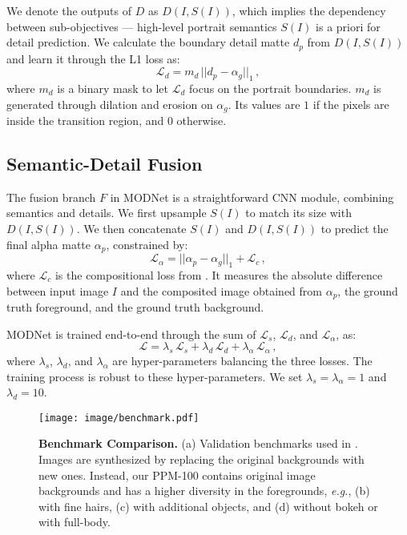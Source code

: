 \documentclass[letterpaper]{article} \usepackage{aaai22}  \usepackage{times}  \usepackage{helvet}  \usepackage{courier}  \usepackage[hyphens]{url}  \usepackage{graphicx} \urlstyle{rm} \def\UrlFont{\rm}  \usepackage{natbib}  \usepackage{caption} \usepackage{booktabs}
\begin{document}
We denote the outputs of $D$ as $D(I, S(I))$, which implies the dependency between sub-objectives --- high-level portrait semantics $S(I)$ is a priori for detail prediction. We calculate the boundary detail matte $d_p$ from $D(I, S(I))$ and learn it through the L1 loss as: 
\begin{equation}
    \mathcal{L}_{d} =  m_d \, \big|\big| d_p - \alpha_g \big|\big|_{1} \, ,
\end{equation}
where $m_d$ is a binary mask to let $\mathcal{L}_d$ focus on the portrait boundaries. $m_d$ is generated through dilation and erosion on $\alpha_{g}$. Its values are $1$ if the pixels are inside the transition region, and $0$ otherwise. 



\subsection{Semantic-Detail Fusion}\label{sec:3_4}
The fusion branch $F$ in MODNet is a straightforward CNN module, combining semantics and details.
We first upsample $S(I)$ to match its size with $D(I, S(I))$. We then concatenate $S(I)$ and $D(I, S(I))$ to predict the final alpha matte $\alpha_{p}$, constrained by:
\begin{equation}
    \mathcal{L}_{\alpha} = \big|\big| \alpha_{p} - \alpha_{g} \big|\big|_{1} + \mathcal{L}_{c} \, , 
\end{equation}
where $\mathcal{L}_c$ is the compositional loss from \cite{DIM}. 
It measures the absolute difference between input image $I$ and the composited image obtained from $\alpha_{p}$, the ground truth foreground, and the ground truth background.

MODNet is trained end-to-end through the sum of $\mathcal{L}_s$, $\mathcal{L}_d$, and $\mathcal{L}_{\alpha}$, as:
\begin{equation}
    \mathcal{L} = \lambda_s \, \mathcal{L}_{s} + \lambda_d \, \mathcal{L}_{d} + \lambda_{\alpha} \, \mathcal{L}_{\alpha} \, , 
\end{equation}
where $\lambda_s$, $\lambda_d$, and $\lambda_{\alpha}$ are hyper-parameters balancing the three losses. The training process is robust to these hyper-parameters. We set $\lambda_s = \lambda_{\alpha} = 1$ and $\lambda_d = 10$. 



\begin{figure*}[ht]
\begin{center}
  \texttt{[image: image/benchmark.pdf]}
\end{center}
  \caption{\textbf{Benchmark Comparison.} 
   (a) Validation benchmarks used in \cite{SHM, BSHM, LFM}. Images are synthesized by replacing the original backgrounds with new ones. Instead, our PPM-100 contains original image backgrounds and has a higher diversity in the foregrounds, {\it e.g.}, (b) with fine hairs, (c) with additional objects, and (d) without bokeh or with full-body.
  }
\label{fig:benchmark}
\end{figure*}
\end{document}
